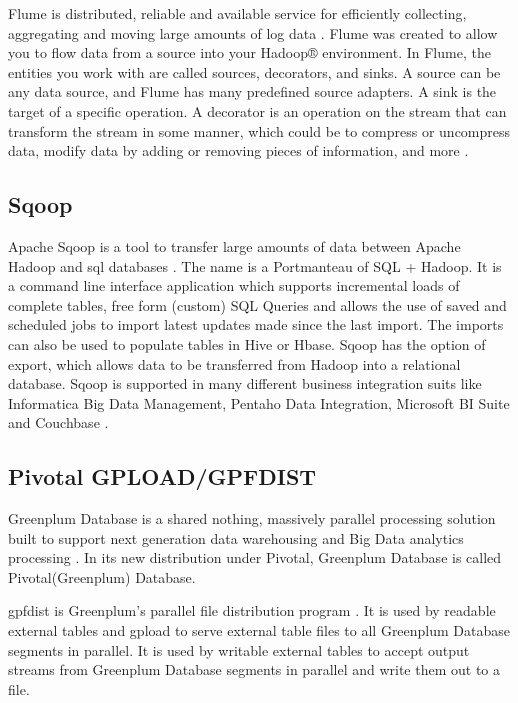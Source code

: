 {     Flume is distributed, reliable and available service for
     efficiently collecting, aggregating and moving large amounts of
     log data \cite{apache-flume}. Flume was created to allow you to
     flow data from a source into your Hadoop® environment.  In Flume,
     the entities you work with are called sources, decorators, and
     sinks. A source can be any data source, and Flume has many
     predefined source adapters. A sink is the target of a specific
     operation. A decorator is an operation on the stream that can
     transform the stream in some manner, which could be to compress
     or uncompress data, modify data by adding or removing pieces of
     information, and more \cite{ibm-flume}.

\subsection{Sqoop}
     
     Apache Sqoop is a tool to transfer large amounts of data between
     Apache Hadoop and sql databases \cite{www-sqoop}. The name is a
     Portmanteau of SQL + Hadoop. It is a command line interface
     application which supports incremental loads of complete tables,
     free form (custom) SQL Queries and allows the use of saved and
     scheduled jobs to import latest updates made since the last
     import. The imports can also be used to populate tables in Hive
     or Hbase. Sqoop has the option of export, which allows data to be
     transferred from Hadoop into a relational database. Sqoop is
     supported in many different business integration suits like
     Informatica Big Data Management, Pentaho Data Integration,
     Microsoft BI Suite and Couchbase \cite{sqoop-wiki}.

\subsection{Pivotal GPLOAD/GPFDIST}

     Greenplum Database is a
     shared nothing, massively parallel processing solution built to
     support next generation data warehousing and Big Data analytics
     processing \cite{book-greenplum-gollapudi2013}. In its new
     distribution under Pivotal, Greenplum
     Database is called Pivotal(Greenplum) Database.

     gpfdist is Greenplum's parallel file
     distribution program \cite{www-gpfdist}. It is used by readable external tables and
     gpload to serve external table files to all Greenplum Database
     segments in parallel. It is used by writable external tables to
     accept output streams from Greenplum Database segments in
     parallel and write them out to a file.

}

